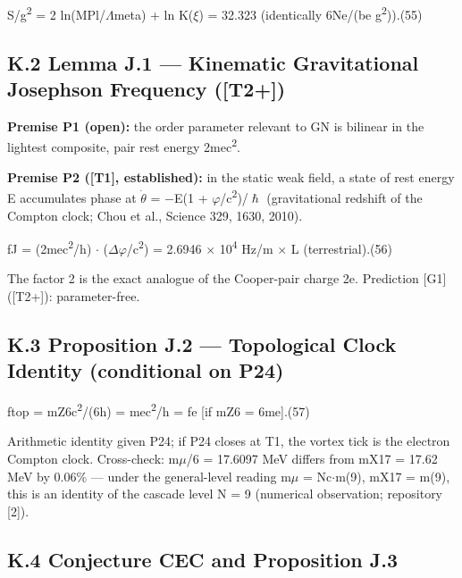 \documentclass[11pt,letterpaper]{article}
\begin{document}
\begingroup\centering S/g\textsuperscript{2} = 2 ln(MPl/$\Lambda$meta) + ln K($\xi$) = 32.323  (identically 6Ne/(be g\textsuperscript{2})).\hspace{2em}(55)\par\endgroup

\subsection*{K.2  Lemma J.1 --- Kinematic Gravitational Josephson Frequency ([T2+])}

\noindent \textbf{Premise P1 (open): }the order parameter relevant to GN is bilinear in the lightest composite, pair rest energy 2mec\textsuperscript{2}. 

\noindent \textbf{Premise P2 ([T1], established): }in the static weak field, a state of rest energy E accumulates phase at $\dot{\theta}$ = $-$E(1 + $\varphi$/c\textsuperscript{2})/$\hslash$ (gravitational redshift of the Compton clock; Chou et al., Science 329, 1630, 2010).

\begingroup\centering fJ = (2mec\textsuperscript{2}/h) $\cdot$ ($\Delta$$\varphi$/c\textsuperscript{2}) = 2.6946 $\times$ 10\textsuperscript{4} Hz/m $\times$ L  (terrestrial).\hspace{2em}(56)\par\endgroup

\noindent The factor 2 is the exact analogue of the Cooper-pair charge 2e. Prediction [G1] ([T2+]): parameter-free.

\subsection*{K.3  Proposition J.2 --- Topological Clock Identity (conditional on P24)}

\begingroup\centering ftop = mZ6c\textsuperscript{2}/(6h) = mec\textsuperscript{2}/h = fe   [if mZ6 = 6me].\hspace{2em}(57)\par\endgroup

\noindent Arithmetic identity given P24; if P24 closes at T1, the vortex tick is the electron Compton clock. Cross-check: m$\mu$/6 = 17.6097 MeV differs from mX17 = 17.62 MeV by 0.06\% --- under the general-level reading m$\mu$ = Nc$\cdot$m(9), mX17 = m(9), this is an identity of the cascade level N = 9 (numerical observation; repository [2]).

\subsection*{K.4  Conjecture CEC and Proposition J.3}
\end{document}
